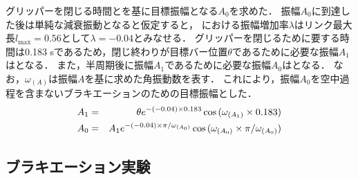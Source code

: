         グリッパーを閉じる時間とを基に目標振幅となる$A_0$を求めた．
        振幅$A_0$に到達した後は単純な減衰振動となると仮定すると，
        における振幅増加率$\lambda$はリンク最大長$l_{\mathrm{max}}=0.56$として$\lambda=-0.04$とみなせる．
        グリッパーを閉じるために要する時間は0.183 sであるため，閉じ終わりが目標バー位置$\theta$であるために必要な振幅$A_1$はとなる．
        また，半周期後に振幅$A_1$であるために必要な振幅$A_0$はとなる．
        なお，$\omega_{(A)}$は振幅$A$を基に求めた角振動数を表す．
        これにより，振幅$A_0$を空中過程を含まないブラキエーションのための目標振幅とした．
        \begin{eqnarray}
                \equlabel{A1}
                A_1&=&\theta e^{-(-0.04)\times0.183}\cos{(\omega_{(A_1)}\times0.183)}\\
                \equlabel{A0}
                A_0&=&A_1 e^{-(-0.04)\times\pi/\omega_{(A_0)}}\cos{(\omega_{(A_0)}\times\pi/\omega_{(A_0)})}
                \end{eqnarray}

        \newpage
        \subsection{ブラキエーション実験}

